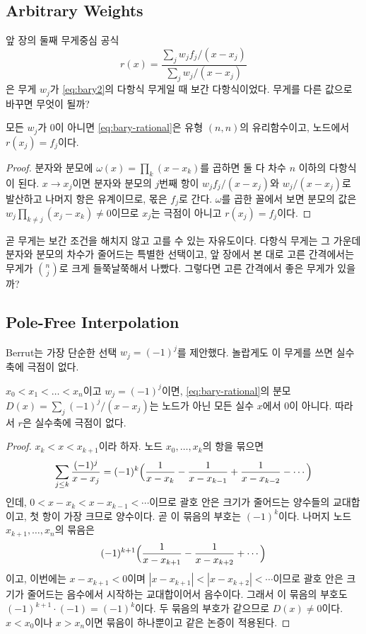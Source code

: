 \subsection{Arbitrary Weights}

앞 장의 둘째 무게중심 공식
\begin{equation}
\label{eq:bary-rational}
r(x)=\frac{\sum_jw_jf_j/(x-x_j)}{\sum_jw_j/(x-x_j)}
\end{equation}
은 무게 $w_j$가 \eqref{eq:bary2}의 다항식 무게일 때 보간 다항식이었다. 무게를 다른 값으로 바꾸면 무엇이 될까?

\begin{proposition}
\label{prop:bary-any-weights}
모든 $w_j$가 $0$이 아니면 \eqref{eq:bary-rational}은 유형 $(n,n)$의 유리함수이고, 노드에서 $r(x_j)=f_j$이다.
\end{proposition}

\begin{proof}
분자와 분모에 $\omega(x)=\prod_k(x-x_k)$를 곱하면 둘 다 차수 $n$ 이하의 다항식이 된다. $x\to x_j$이면 분자와 분모의 $j$번째 항이 $w_jf_j/(x-x_j)$와 $w_j/(x-x_j)$로 발산하고 나머지 항은 유계이므로, 몫은 $f_j$로 간다. $\omega$를 곱한 꼴에서 보면 분모의 값은 $w_j\prod_{k\ne j}(x_j-x_k)\ne0$이므로 $x_j$는 극점이 아니고 $r(x_j)=f_j$이다.
\end{proof}

곧 무게는 보간 조건을 해치지 않고 고를 수 있는 자유도이다. 다항식 무게는 그 가운데 분자와 분모의 차수가 줄어드는 특별한 선택이고, 앞 장에서 본 대로 고른 간격에서는 무게가 $\binom nj$로 크게 들쭉날쭉해서 나빴다. 그렇다면 고른 간격에서 좋은 무게가 있을까?

\subsection{Pole-Free Interpolation}

Berrut는 가장 단순한 선택 $w_j=(-1)^j$를 제안했다\cite{berrut1988rational}. 놀랍게도 이 무게를 쓰면 실수축에 극점이 없다.

\begin{theorem}[Berrut]
\label{thm:berrut-no-poles}
$x_0<x_1<\dots<x_n$이고 $w_j=(-1)^j$이면, \eqref{eq:bary-rational}의 분모 $D(x)=\sum_j(-1)^j/(x-x_j)$는 노드가 아닌 모든 실수 $x$에서 $0$이 아니다. 따라서 $r$은 실수축에 극점이 없다.
\end{theorem}

\begin{proof}
$x_k<x<x_{k+1}$이라 하자. 노드 $x_0,\dots,x_k$의 항을 묶으면
\[
\sum_{j\le k}\frac{(-1)^j}{x-x_j}=(-1)^k\Bigl(\frac1{x-x_k}-\frac1{x-x_{k-1}}+\frac1{x-x_{k-2}}-\cdots\Bigr)
\]
인데, $0<x-x_k<x-x_{k-1}<\cdots$이므로 괄호 안은 크기가 줄어드는 양수들의 교대합이고, 첫 항이 가장 크므로 양수이다. 곧 이 묶음의 부호는 $(-1)^k$이다. 나머지 노드 $x_{k+1},\dots,x_n$의 묶음은
\[
(-1)^{k+1}\Bigl(\frac1{x-x_{k+1}}-\frac1{x-x_{k+2}}+\cdots\Bigr)
\]
이고, 이번에는 $x-x_{k+1}<0$이며 $|x-x_{k+1}|<|x-x_{k+2}|<\cdots$이므로 괄호 안은 크기가 줄어드는 음수에서 시작하는 교대합이어서 음수이다. 그래서 이 묶음의 부호도 $(-1)^{k+1}\cdot(-1)=(-1)^k$이다. 두 묶음의 부호가 같으므로 $D(x)\ne0$이다. $x<x_0$이나 $x>x_n$이면 묶음이 하나뿐이고 같은 논증이 적용된다.
\end{proof}

